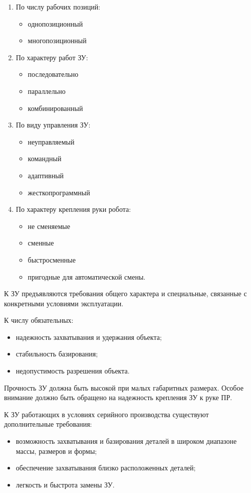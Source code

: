 \documentclass[unicode, 12pt, a4paper, oneside]{article}
\begin{document}
\begin{enumerate}
\begin{itemize}
\end{itemize}
\item	По числу рабочих позиций:
\begin{itemize}
\item	однопозиционный
\item	многопозиционный
\end{itemize}
\item	По характеру работ ЗУ:
\begin{itemize}
\item	последовательно
\item	параллельно
\item	комбинированный
\end{itemize}
\item	По виду управления ЗУ:
\begin{itemize}
\item	неуправляемый
\item	командный
\item	адаптивный
\item	жесткопрограммный
\end{itemize}
\item	По характеру крепления руки робота:
\begin{itemize}
\item	не сменяемые
\item	сменные
\item	быстросменные
\item	пригодные для автоматической смены.
\end{itemize}
\end{enumerate}

К ЗУ предъявляются требования общего характера и специальные, связанные с конкретными условиями эксплуатации.

К числу обязательных:
\begin{itemize}
\item	надежность захватывания и удержания объекта;
\item	стабильность базирования;
\item	недопустимость разрешения объекта.
\end{itemize}

Прочность ЗУ должна быть высокой при малых габаритных размерах. Особое внимание должно быть обращено на надежность крепления ЗУ к руке ПР.

К ЗУ работающих в условиях серийного производства существуют дополнительные требования:
\begin{itemize}
\item	возможность захватывания и базирования деталей в широком диапазоне массы, размеров и формы;
\item	обеспечение захватывания близко расположенных деталей;
\item	легкость и быстрота замены ЗУ.
\end{itemize}
\end{document}
